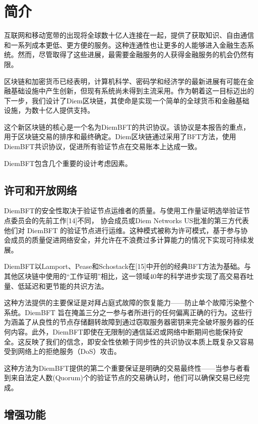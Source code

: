 \section{简介}

互联网和移动宽带的出现将全球数十亿人连接在一起，提供了获取知识、自由通信和一系列成本更低、更方便的服务。这种连通性也让更多的人能够进入金融生态系统。然而，尽管取得了这些进展，最需要金融服务的人获得金融服务的机会仍然有限。

区块链和加密货币已经表明，计算机科学、密码学和经济学的最新进展有可能在金融基础设施中产生创新，但现有系统尚未得到主流采用。作为朝着这一目标迈出的下一步，我们设计了Diem区块链，其使命是实现一个简单的全球货币和金融基础设施，为数十亿人提供支持。

这个新区块链的核心是一个名为DiemBFT的共识协议。该协议是本报告的重点，用于区块链交易的排序和最终确定。Diem区块链通过采用了BFT方法，使用DiemBFT共识协议，促进所有验证节点在交易账本上达成一致。

DiemBFT包含几个重要的设计考虑因素。

\subsection{许可和开放网络}

DiemBFT的安全性取决于验证节点运维者的质量。与使用工作量证明选举验证节点委员会的先前工作[14]不同， 协会成员或Diem Networks US批准的第三方代表他们对 DiemBFT 的验证节点进行运维。这种模式被称为许可模式，基于参与协会成员的质量促进网络安全，并允许在不浪费过多计算能力的情况下实现可持续发展。

DiemBFT以Lamport、Pease和Schostack在[15]中开创的经典BFT方法为基础。与其他区块链中使用的“工作证明”相比，这一领域40年的科学进步实现了高交易吞吐量、低延迟和更节能的共识方法。

这种方法提供的主要保证是对拜占庭式故障的恢复能力——防止单个故障污染整个系统。DiemBFT 旨在掩盖三分之一参与者所进行的任何偏离正确的行为。这些行为涵盖了从良性的节点存储翻转故障到通过窃取服务器密钥来完全破坏服务器的任何内容。此外，DiemBFT即使在无限制的通信延迟或网络中断期间也能保持安全。这反映了我们的信念，即安全性依赖于同步性的共识协议本质上既复杂又容易受到网络上的拒绝服务（DoS）攻击。

这种方法为DiemBFT提供的第二个重要保证是明确的交易最终性——当参与者看到来自法定人数(Quorum)个的验证节点的交易确认时，他们可以确保交易已经完成。

\subsection{增强功能}

